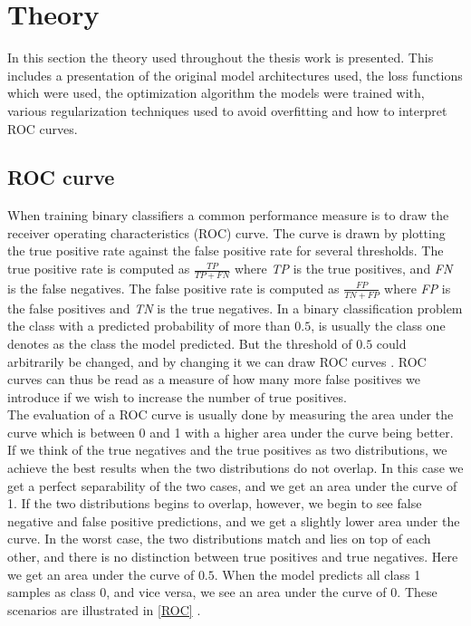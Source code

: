 \section{Theory}
In this section the theory used throughout the thesis work is presented. This includes a presentation of the original model architectures used, the loss functions which were used, the optimization algorithm the models were trained with, various regularization techniques used to avoid overfitting and how to interpret ROC curves.


\subsection{ROC curve}
When training binary classifiers a common performance measure is to draw the receiver operating characteristics (ROC) curve. The curve is drawn by plotting the true positive rate against the false positive rate for several thresholds. The true positive rate is computed as $\frac{TP}{TP+FN}$ where \textit{TP} is the true positives, and \textit{FN} is the false negatives. The false positive rate is computed as $\frac{FP}{TN+FP}$ where \textit{FP} is the false positives and \textit{TN} is the true negatives. In a binary classification problem the class with a predicted probability of more than $0.5$, is usually the class one denotes as the class the model predicted. But the threshold of $0.5$ could arbitrarily be changed, and by changing it we can draw ROC curves \cite{ROC}. ROC curves can thus be read as a measure of how many more false positives we introduce if we wish to increase the number of true positives.\\
The evaluation of a ROC curve is usually done by measuring the area under the curve which is between 0 and 1 with a higher area under the curve being better. If we think of the true negatives and the true positives as two distributions, we achieve the best results when the two distributions do not overlap. In this case we get a perfect separability of the two cases, and we get an area under the curve of 1. If the two distributions begins to overlap, however, we begin to see false negative and false positive predictions, and we get a slightly lower area under the curve. In the worst case, the two distributions match and lies on top of each other, and there is no distinction between true positives and true negatives. Here we get an area under the curve of $0.5$. When the model predicts all class 1 samples as class 0, and vice versa, we see an area under the curve of $0$. These scenarios are illustrated in \autoref{ROC} \cite{ROC}.

